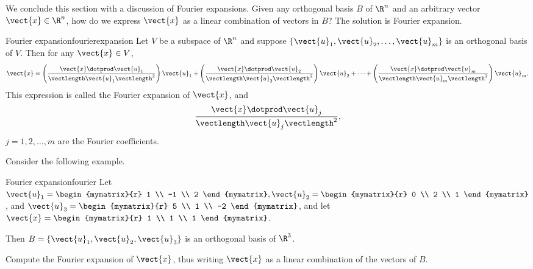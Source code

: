 We conclude this section with a discussion of Fourier expansions. Given any orthogonal basis $B$ of $\R^n$ and an arbitrary vector $\vect{x} \in \R^n$, how do we express $\vect{x}$ as a linear combination of vectors in $B$? The solution is Fourier expansion. 

\begin{theorem}{Fourier expansion}{fourierexpansion}
Let $V$ be a subspace of $\R^n$ and suppose $\{\vect{u}_1, \vect{u}_2, \ldots, \vect{u}_m\}$
is an orthogonal basis of $V$. 
Then for any $\vect{x}\in V$,
\[ \vect{x} = 
\left(\frac{\vect{x}\dotprod \vect{u}_1}{\vectlength \vect{u}_1 \vectlength^2}\right) \vect{u}_1 +
\left(\frac{\vect{x}\dotprod \vect{u}_2}{\vectlength \vect{u}_2 \vectlength^2}\right) \vect{u}_2 +
\cdots +
\left(\frac{\vect{x}\dotprod \vect{u}_m}{\vectlength \vect{u}_m \vectlength^2}\right) \vect{u}_m.
\]
This expression is called the Fourier expansion 
of $\vect{x}$, and 
\[ \frac{\vect{x}\dotprod \vect{u}_j}{\vectlength \vect{u}_j \vectlength^2},\]
$j=1,2,\ldots,m$
are the Fourier coefficients.
\end{theorem}

Consider the following example.

\begin{example}{Fourier expansion}{fourier}
Let
$\vect{u}_1= \begin{mymatrix}{r} 1 \\ -1 \\ 2 \end{mymatrix},
\vect{u}_2= \begin{mymatrix}{r} 0 \\ 2 \\ 1  \end{mymatrix}$,
and
$\vect{u}_3 =\begin{mymatrix}{r} 5 \\ 1 \\ -2 \end{mymatrix}$, 
and let 
$\vect{x} =\begin{mymatrix}{r} 1 \\ 1 \\ 1 \end{mymatrix}$.

Then $B=\{\vect{u}_1, \vect{u}_2, \vect{u}_3\}$
is an orthogonal basis of $\R^3$. 

Compute the Fourier expansion of $\vect{x}$, thus writing $\vect{x}$ as  a linear combination of the vectors of $B$. 
\end{example}

